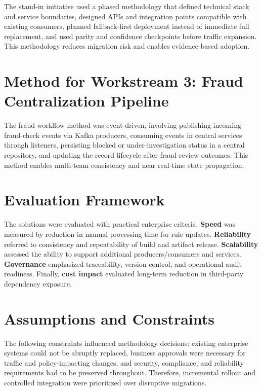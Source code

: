 The stand-in initiative used a phased methodology that defined technical stack and service boundaries, designed APIs and integration points compatible with existing consumers, planned fallback-first deployment instead of immediate full replacement, and used parity and confidence checkpoints before traffic expansion. This methodology reduces migration risk and enables evidence-based adoption.

\section{Method for Workstream 3: Fraud Centralization Pipeline}

The fraud workflow method was event-driven, involving publishing incoming fraud-check events via Kafka producers, consuming events in central services through listeners, persisting blocked or under-investigation status in a central repository, and updating the record lifecycle after fraud review outcomes. This method enables multi-team consistency and near real-time state propagation.

\section{Evaluation Framework}

The solutions were evaluated with practical enterprise criteria. \textbf{Speed} was measured by reduction in manual processing time for rule updates. \textbf{Reliability} referred to consistency and repeatability of build and artifact release. \textbf{Scalability} assessed the ability to support additional producers/consumers and services. \textbf{Governance} emphasized traceability, version control, and operational audit readiness. Finally, \textbf{cost impact} evaluated long-term reduction in third-party dependency exposure.

\section{Assumptions and Constraints}

The following constraints influenced methodology decisions: existing enterprise systems could not be abruptly replaced, business approvals were necessary for traffic and policy-impacting changes, and security, compliance, and reliability requirements had to be preserved throughout. Therefore, incremental rollout and controlled integration were prioritized over disruptive migrations.